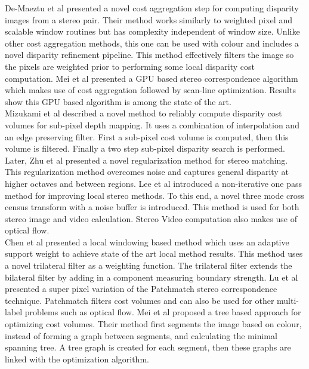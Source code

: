 De-Maeztu et al \cite{De11Linear} presented a novel cost aggregation step for computing disparity images from a stereo pair. Their method works similarly to weighted pixel and scalable window routines but has complexity independent of window size. Unlike other cost aggregation methods, this one can be used with colour and includes a novel disparity refinement pipeline. This method effectively filters the image so the pixels are weighted prior to performing some local disparity cost computation. Mei et al \cite{Mei11Building} presented a GPU based stereo correspondence algorithm which makes use of cost aggregation followed by scan-line optimization. Results show this GPU based algorithm is among the state of the art. \\


Mizukami et al \cite{Mizukami12Sub} described a novel method to reliably compute disparity cost volumes for sub-pixel depth mapping. It uses a combination of interpolation and an edge preserving filter. First a sub-pixel cost volume is computed, then this volume is filtered. Finally a two step sub-pixel disparity search is performed. Later, Zhu et al \cite{Zhu12Locally} presented a novel regularization method for stereo matching. This regularization method overcomes noise and captures general disparity at higher octaves and between regions. Lee et al \cite{Lee13Local} introduced a non-iterative one pass method for improving local stereo methods. To this end, a novel three mode cross census transform with a noise buffer is introduced. This method is used for both stereo image and video calculation. Stereo Video computation also makes use of optical flow. \\


Chen et al \cite{Chen13Novel} presented a local windowing based method which uses an adaptive support weight to achieve state of the art local method results. This method uses a novel trilateral filter as a weighting function. The trilateral filter extends the bilateral filter by adding in a component measuring boundary strength. Lu et al \cite{Lu13Patch} presented a super pixel variation of the Patchmatch stereo correspondence technique. Patchmatch filters cost volumes and can also be used for other multi-label problems such as optical flow. Mei et al \cite{Mei13Segment} proposed a tree based approach for optimizing cost volumes. Their method first segments the image based on colour, instead of forming a graph between segments, and calculating the minimal spanning tree. A tree graph is created for each segment, then these graphs are linked with the optimization algorithm.\\


